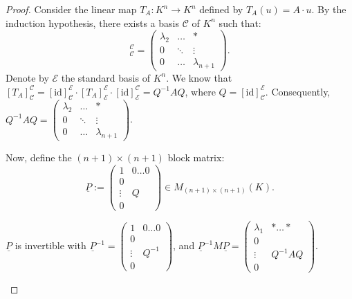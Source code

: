 \begin{proof}
  Consider the linear map $T_A : K^n \rightarrow K^n$ defined by $T_A(u) = A \cdot u$.
  By the induction hypothesis, there exists a basis $\mathcal{C}$ of $K^n$ such that:
  \begin{equation}
    [T_A]_{\mathcal{C}}^{\mathcal{C}} = \begin{pmatrix} \lambda_2 & \dots & * \\ 0 & \ddots & \vdots \\ 0 & \dots & \lambda_{n+1} \end{pmatrix}.
  \end{equation}
  Denote by $\mathcal{E}$ the standard basis of $K^n$. We know that $[T_A]_{\mathcal{C}}^{\mathcal{C}} = [\mathrm{id}]_{\mathcal{C}}^{\mathcal{E}} \cdot [T_A]_{\mathcal{E}}^{\mathcal{E}} \cdot [\mathrm{id}]_{\mathcal{E}}^{\mathcal{C}} = Q^{-1}AQ$, where $Q = [\mathrm{id}]_{\mathcal{C}}^{\mathcal{E}}$.
  Consequently, $Q^{-1}AQ = \left(\begin{smallmatrix} \lambda_2 & \dots & * \\ 0 & \ddots & \vdots \\ 0 & \dots & \lambda_{n+1} \end{smallmatrix}\right)$.
  
  \noindent
  Now, define the $(n+1) \times (n+1)$ block matrix:
  \begin{equation} \label{eq:P_underline}
    \underline{P} := \left(\begin{array}{c|c} 1 & 0 \dots 0 \\ \hline 0 & \\ \vdots & Q \\ 0 & \end{array}\right) \in M_{(n+1) \times (n+1)}(K).
  \end{equation}

  \begin{claim*}\label{claim:P_invertible_trig}
    $\underline{P}$ is invertible with $\underline{P}^{-1} = \left(\begin{array}{c|c} 1 & 0 \dots 0 \\ \hline 0 & \\ \vdots & Q^{-1} \\ 0 & \end{array}\right)$, and $\underline{P}^{-1}M\underline{P} = \left(\begin{array}{c|c} \lambda_1 & * \dots * \\ \hline 0 & \\ \vdots & Q^{-1}AQ \\ 0 & \end{array}\right)$.
  \end{claim*}


\end{proof}
